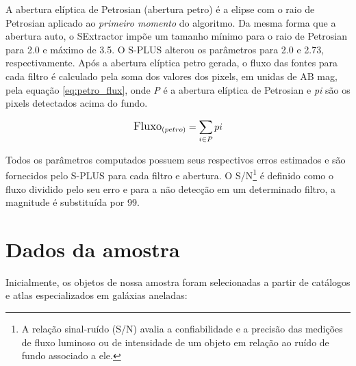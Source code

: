 A abertura elíptica de Petrosian (abertura petro) é a elipse com o raio de Petrosian aplicado ao \emph{primeiro momento} do algoritmo. Da mesma forma que a abertura auto, o SExtractor impõe um tamanho mínimo para o raio de Petrosian para 2.0 e máximo de 3.5. O S-PLUS alterou os parâmetros para 2.0 e 2.73, respectivamente. Após a abertura elíptica petro gerada, o fluxo das fontes para cada filtro é calculado pela soma dos valores dos pixels, em unidas de AB mag, pela equação \ref{eq:petro_flux}, onde \emph{P} é a abertura elíptica de Petrosian e \emph{pi} são os pixels detectados acima do fundo.

\begin{equation} \label{eq:petro_flux}
\large
\text{Fluxo}_{(petro)} = \sum_{i \in P} pi
\end{equation}

Todos os parâmetros computados possuem seus respectivos erros estimados e são fornecidos pelo S-PLUS para cada filtro e abertura. O S/N\footnote{A relação sinal-ruído (S/N) avalia a confiabilidade e a precisão das medições de fluxo luminoso ou de intensidade de um objeto em relação ao ruído de fundo associado a ele.} é definido como o fluxo dividido pelo seu erro e para a não detecção em um determinado filtro, a magnitude é substituída por 99.

\section{Dados da amostra}

Inicialmente, os objetos de nossa amostra foram selecionadas a partir de catálogos e atlas especializados em galáxias aneladas:

